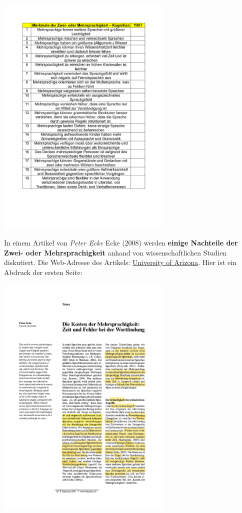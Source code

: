 \documentclass[
  letterpaper,
]{scrbook}
\begin{document}
\includegraphics[width=3.31in,height=\textheight]{./pictures/Mehrsprachigkeit_Behauptungen_Page3.png}

In einem Artikel von \emph{Peter Ecke} Ecke (2008) werden \textbf{einige
Nachteile der Zwei- oder Mehrsprachigkeit} anhand von wissenschaftlichen
Studien diskutiert. Die Web-Adresse des Artikels:
\href{http://www.u.arizona.edu/~eckep/Ecke\%2008\%20Kosten\%20der\%20MS.pdf}{University
of Arizona}. Hier ist ein Abdruck der ersten Seite:

\includegraphics[width=3.31in,height=\textheight]{./pictures/TOT_bilangual_baby2_08ecke_annotated_Page1.png}
\end{document}
